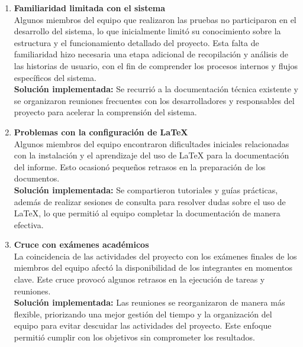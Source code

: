 \documentclass[stu, 12pt, letterpaper, donotrepeattitle, floatsintext, natbib]{apa7}
\begin{document}
\begin{enumerate}
    \item \textbf{Familiaridad limitada con el sistema} \\
    Algunos miembros del equipo que realizaron las pruebas no participaron en el desarrollo del sistema, lo que inicialmente limitó su conocimiento sobre la estructura y el funcionamiento detallado del proyecto. Esta falta de familiaridad hizo necesaria una etapa adicional de recopilación y análisis de las historias de usuario, con el fin de comprender los procesos internos y flujos específicos del sistema.\\
    \textbf{Solución implementada:} Se recurrió a la documentación técnica existente y se organizaron reuniones frecuentes con los desarrolladores y responsables del proyecto para acelerar la comprensión del sistema.

    \item \textbf{Problemas con la configuración de LaTeX} \\
    Algunos miembros del equipo encontraron dificultades iniciales relacionadas con la instalación y el aprendizaje del uso de LaTeX para la documentación del informe. Esto ocasionó pequeños retrasos en la preparación de los documentos. \\
    \textbf{Solución implementada:} Se compartieron tutoriales y guías prácticas, además de realizar sesiones de consulta para resolver dudas sobre el uso de LaTeX, lo que permitió al equipo completar la documentación de manera efectiva.

    \item \textbf{Cruce con exámenes académicos} \\
    La coincidencia de las actividades del proyecto con los exámenes finales de los miembros del equipo afectó la disponibilidad de los integrantes en momentos clave. Este cruce provocó algunos retrasos en la ejecución de tareas y reuniones. \\
    \textbf{Solución implementada:} Las reuniones se reorganizaron de manera más flexible, priorizando una mejor gestión del tiempo y la organización del equipo para evitar descuidar las actividades del proyecto. Este enfoque permitió cumplir con los objetivos sin comprometer los resultados.


\end{enumerate}
\end{document}
